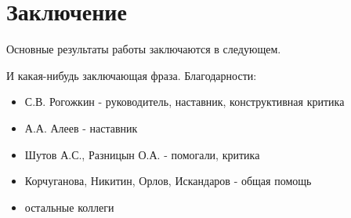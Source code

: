 \chapter*{Заключение}                       %


Основные результаты работы заключаются в следующем.

И какая-нибудь заключающая фраза.
\clearpage
Благодарности:
\begin{itemize}
	\item С.В. Рогожкин - руководитель, наставник, конструктивная критика
	\item А.А. Алеев - наставник
	\item Шутов А.С., Разницын О.А. - помогали, критика
	\item Корчуганова, Никитин, Орлов, Искандаров - общая помощь
	\item остальные коллеги
\end{itemize}



